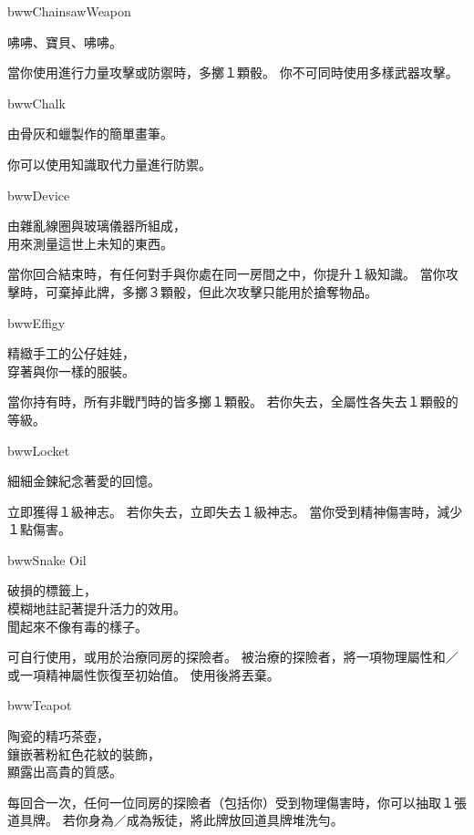 \begin{ItemCard}{bww}{Chainsaw}{Weapon}
	\begin{CardStory}
		咈咈、寶貝、咈咈。
	\end{CardStory}
	當你使用\ThisName{}進行力量攻擊或防禦時，多擲１顆骰。\smallbreak
	你不可同時使用多樣武器攻擊。\smallbreak
\end{ItemCard}%
\linebreak[0]%
\begin{ItemCard}{bww}{Chalk}{}
	\begin{CardStory}
		由骨灰和蠟製作的簡單畫筆。
	\end{CardStory}
	你可以使用知識取代力量進行防禦。\smallbreak
\end{ItemCard}%
\linebreak[0]%
\begin{ItemCard}{bww}{Device}{}
	\begin{CardStory}
		由雜亂線圈與玻璃儀器所組成，\\
		用來測量這世上未知的東西。
	\end{CardStory}
	當你回合結束時，有任何對手與你處在同一房間之中，你提升１級知識。\smallbreak
	當你攻擊時，可棄掉此牌，多擲３顆骰，但此次攻擊只能用於搶奪物品。\smallbreak
\end{ItemCard}%
\linebreak[0]%
\begin{ItemCard}{bww}{Effigy}{}
	\begin{CardStory}
		精緻手工的公仔娃娃，\\
		穿著與你一樣的服裝。
	\end{CardStory}
	當你持有\ThisName{}時，所有非戰鬥時的皆多擲１顆骰。\smallbreak
	若你失去\ThisName{}，全屬性各失去１顆骰的等級。\smallbreak
\end{ItemCard}%
\linebreak[0]%
\begin{ItemCard}{bww}{Locket}{}
	\begin{CardStory}
		細細金鍊紀念著愛的回憶。
	\end{CardStory}
	立即獲得１級神志。\smallbreak
	若你失去\ThisName{}，立即失去１級神志。\smallbreak
	當你受到精神傷害時，減少１點傷害。\smallbreak
\end{ItemCard}%
\linebreak[0]%
\begin{ItemCard}{bww}{Snake Oil}{}
	\begin{CardStory}
		破損的標籤上，\\
		模糊地註記著提升活力的效用。\\
		聞起來不像有毒的樣子。
	\end{CardStory}
	可自行使用，或用於治療同房的探險者。\smallbreak
	被\ThisName{}治療的探險者，將一項物理屬性和／或一項精神屬性恢復至初始值。\smallbreak
	使用後將\ThisName{}丟棄。\smallbreak
\end{ItemCard}%
\linebreak[0]%
\begin{ItemCard}{bww}{Teapot}{}
	\begin{CardStory}
		陶瓷的精巧茶壺，\\
		鑲嵌著粉紅色花紋的裝飾，\\
		顯露出高貴的質感。
	\end{CardStory}
	每回合一次，任何一位同房的探險者（包括你）受到物理傷害時，你可以抽取１張道具牌。\smallbreak
	若你身為／成為叛徒，將此牌放回道具牌堆洗勻。\smallbreak
\end{ItemCard}%
\linebreak[0]%
